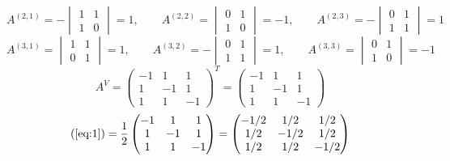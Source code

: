 \documentclass{article}
\theoremstyle{definition}
\theoremstyle{plain}
\begin{document}
\begin{equation*}
  A^{(2, 1)} = -
  \begin{vmatrix}
    1 & 1\\
    1 & 0
  \end{vmatrix}
  = 1, \qquad
  A^{(2, 2)} =
  \begin{vmatrix}
    0 & 1\\
    1 & 0
  \end{vmatrix}
  = -1, \qquad
  A^{(2, 3)} = -
  \begin{vmatrix}
    0 & 1\\
    1 & 1
  \end{vmatrix}
  = 1
\end{equation*}
\begin{equation*}
  A^{(3, 1)} =
  \begin{vmatrix}
    1 & 1\\
    0 & 1
  \end{vmatrix}
  = 1, \qquad
  A^{(3, 2)} = -
  \begin{vmatrix}
    0 & 1\\
    1 & 1
  \end{vmatrix}
  = 1, \qquad
  A^{(3, 3)} =
  \begin{vmatrix}
    0 & 1\\
    1 & 0
  \end{vmatrix}
  = -1
\end{equation*}
\begin{equation*}
  A^{V} =
  \begin{pmatrix}
    -1 & 1 & 1\\
    1 & -1 & 1\\
    1 & 1 & -1
  \end{pmatrix}^{T}
  =
  \begin{pmatrix}
    -1 & 1 & 1\\
    1 & -1 & 1\\
    1 & 1 & -1
  \end{pmatrix}
\end{equation*}
\begin{equation*}
  (\ref{eq:1}) =
  \frac{1}{2}
  \begin{pmatrix}
    -1 & 1 & 1\\
    1 & -1 & 1\\
    1 & 1 & -1
  \end{pmatrix}
  =
  \begin{pmatrix}
    -1/2 & 1/2 & 1/2\\
    1/2 & -1/2 & 1/2\\
    1/2 & 1/2 & -1/2
  \end{pmatrix}
\end{equation*}
\end{document}
